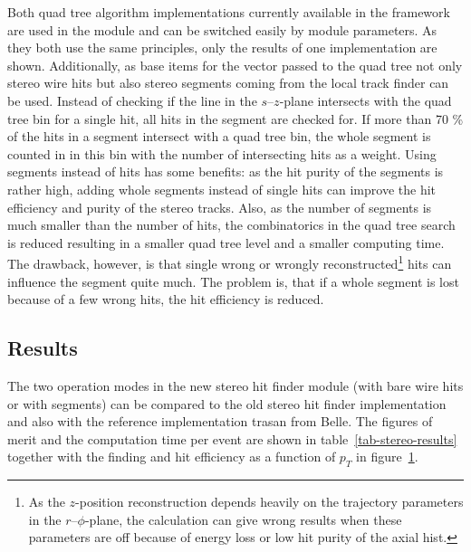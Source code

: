 Both quad tree algorithm implementations currently available in the framework are used in the module and can be switched easily by module parameters. As they both use the same principles, only the results of one implementation are shown. Additionally, as base items for the vector passed to the quad tree not only stereo wire hits but also stereo segments coming from the local track finder can be used. Instead of checking if the line in the $s$--$z$-plane intersects with the quad tree bin for a single hit, all hits in the segment are checked for. If more than 70 \% of the hits in a segment intersect with a quad tree bin, the whole segment is counted in in this bin with the number of intersecting hits as a weight. Using segments instead of hits has some benefits: as the hit purity of the segments is rather high, adding whole segments instead of single hits can improve the hit efficiency and purity of the stereo tracks. Also, as the number of segments is much smaller than the number of hits, the combinatorics in the quad tree search is reduced resulting in a smaller quad tree level and a smaller computing time. The drawback, however, is that single wrong or wrongly reconstructed\footnote{As the $z$-position reconstruction depends heavily on the trajectory parameters in the $r$--$\phi$-plane, the calculation can give wrong results when these parameters are off because of energy loss or low hit purity of the axial hist.} hits can influence the segment quite much. The problem is, that if a whole segment is lost because of a few wrong hits, the hit efficiency is reduced.

\subsection{Results}

The two operation modes in the new stereo hit finder module (with bare wire hits or with segments) can be compared to the old stereo hit finder implementation and also with the reference implementation trasan from Belle. The figures of merit and the computation time per event are shown in table~\ref{tab-stereo-results} together with the finding and hit efficiency as a function of $p_T$ in figure~\ref{fig-stereo-results}. 

\begin{table}
  \caption{}
  \label{tab-stereo-results}
\end{table}

\begin{figure}
  \caption{}
  \label{fig-stereo-results}
\end{figure}

